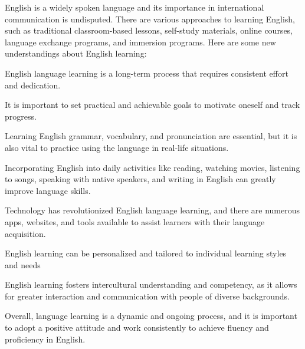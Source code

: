 \documentclass[lang=cn,10pt]{elegantbook}
\begin{document}
\begin{solution}
	
	English is a widely spoken language and its importance in international communication is undisputed. There are various approaches to learning English, such as traditional classroom-based lessons, self-study materials, online courses, language exchange programs, and immersion programs. Here are some new understandings about English learning:
	
	English language learning is a long-term process that requires consistent effort and dedication.
	
	It is important to set practical and achievable goals to motivate oneself and track progress.
	
	Learning English grammar, vocabulary, and pronunciation are essential, but it is also vital to practice using the language in real-life situations.
	
	Incorporating English into daily activities like reading, watching movies, listening to songs, speaking with native speakers, and writing in English can greatly improve language skills.
	
	Technology has revolutionized English language learning, and there are numerous apps, websites, and tools available to assist learners with their language acquisition. 
	
	English learning can be personalized and tailored to individual learning styles and needs 
	
	English learning fosters intercultural understanding and competency, as it allows for greater interaction and communication with people of diverse backgrounds.
	
	Overall, language learning is a dynamic and ongoing process, and it is important to adopt a positive attitude and work consistently to achieve fluency and proficiency in English.
	
\end{solution}
\end{document}
